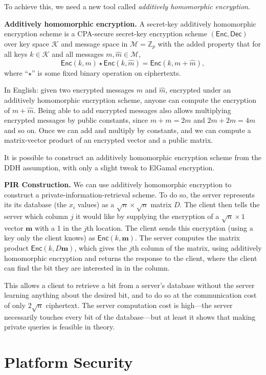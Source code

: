 \documentclass[
  letterpaper,
]{scrbook}
\newcommand{\Z}{\mathbb{Z}}
\newcommand{\calK}{\mathcal{K}}
\newcommand{\calM}{\mathcal{M}}
\renewcommand{\vec}[1]{\mathbf{#1}}
\newcommand{\Enc}{\mathsf{Enc}}
\newcommand{\Dec}{\mathsf{Dec}}
\theoremstyle{definition}
\theoremstyle{plain}
\theoremstyle{plain}
\theoremstyle{remark}
\begin{document}
To achieve this, we need a new tool called \emph{additively homomorphic
encryption}.

\textbf{Additively homomorphic encryption.} A secret-key additively
homomorphic encryption scheme is a CPA-secure secret-key encryption
scheme \((\Enc,
\Dec)\) over key space \(\calK\) and message space in \(\calM = \Z_p\)
with the added property that for all keys \(k \in \calK\) and all
messages \(m, \hat{m} \in \calM\),
\[ \Enc(k, m) \star \Enc(k, \hat{m}) = \Enc(k, m + \hat{m}), \] where
``\(\star\)'' is some fixed binary operation on ciphertexts.

In English: given two encrypted messages \(m\) and \(\hat m\), encrypted
under an additively homomorphic encryption scheme, anyone can compute
the encryption of \(m + \hat m\). Being able to add encrypted messages
also allows multiplying encrypted messages by public constants, since
\(m + m = 2m\) and \(2m + 2m = 4m\) and so on. Once we can add and
multiply by constants, and we can compute a matrix-vector product of an
encrypted vector and a public matrix.

It is possible to construct an additively homomorphic encryption scheme
from the DDH assumption, with only a slight tweak to ElGamal encryption.

\textbf{PIR Construction.} We can use additively homomorphic encryption
to construct a private-information-retrieval scheme. To do so, the
server represents its its database (the \(x_i\) values) as a \(\sqrt{n}
\times \sqrt{n}\) matrix \(D\). The client then tells the server which
column \(j\) it would like by supplying the encryption of a
\(\sqrt{n} \times 1\) vector \(\vec{m}\) with a 1 in the \(j\)th
location. The client sends this encryption (using a key only the client
knows) as \(\Enc(k, \vec{m})\). The server computes the matrix product
\(\Enc(k,
D\vec{m})\), which gives the \(j\)th column of the matrix, using
additively homomorphic encryption and returns the response to the
client, where the client can find the bit they are interested in in the
column.

This allows a client to retrieve a bit from a server's database without
the server learning anything about the desired bit, and to do so at the
communication cost of only \(2\sqrt{n}\) ciphertext. The server
computation cost is high---the server necessarily touches every bit of
the database---but at least it shows that making private queries is
feasible in theory.

\part{Platform Security}
\end{document}
